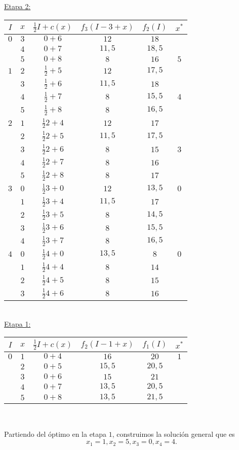 \documentclass[MIOP.tex]{subfiles}
\begin{document}
\begin{solucion}
\underline{Etapa 2:}\

\begin{tabular}{|c| c| c| c | c| c|}
\hline
$I$ & $x$ & $\frac{1}{2}I+c(x)$ & $f_3(I-3+x)$ &  $f_2(I)$ & $x^* $ \\
\hline
$0$ & $3$ & $0+6$ &  $12$  & $18$& \\
\hline
 & $4$ & $0+7$ &$11,5$ & $18,5$ &\\
\hline
 & $5$ & $0+8$ & $8$ & $16$& $\boxed{5}$\\
\hline
\hline
$1$ & $2$ & $\frac{1}{2}+5$ & $12$  & $17,5$& \\
\hline
 & $3$ & $\frac{1}{2}+6$ &$11,5$ & $18$ &\\
\hline
 & $4$ & $\frac{1}{2}+7$ & $8$ & $15,5$& $\boxed{4}$\\
\hline
 & $5$ & $\frac{1}{2}+8$ & $8$ & $16,5$ & \\
\hline
\hline
$2$ & $1$ & $\frac{1}{2}2+4$ & $12$  & $17$& \\
\hline
 & $2$ & $\frac{1}{2}2+5$ &$11,5$ & $17,5$ &\\
\hline
 & $3$ & $\frac{1}{2}2+6$ &$8$ & $15$ &$\boxed{3}$\\
\hline
 & $4$ & $\frac{1}{2}2+7$ & $8$ & $16$&\\
\hline
 & $5$ & $\frac{1}{2}2+8$ & $8$ & $17$ & \\
\hline
\hline
$3$ & $0$ & $\frac{1}{2}3+0$ & $12$  & $13,5$ & $\boxed{0}$\\
\hline
 & $1$ & $\frac{1}{2}3+4$ &$11,5$ & $17$ &\\
\hline
 & $2$ & $\frac{1}{2}3+5$ &$8$ & $14,5$ &\\
\hline
 & $3$ & $\frac{1}{2}3+6$ & $8$ & $15,5$&\\
 \hline
 & $4$ & $\frac{1}{2}3+7$ & $8$ & $16,5$&\\
 \hline
 \hline
 $4$ & $0$ & $\frac{1}{2}4+0$ & $13,5$  & $8$& $\boxed{0}$\\
\hline
 & $1$ & $\frac{1}{2}4+4$ &$8$ & $14$ &\\
\hline
 & $2$ & $\frac{1}{2}4+5$ &$8$ & $15$ &\\
 \hline
  & $3$ & $\frac{1}{2}4+6$ &$8$ & $16$ &\\
 \hline
\end{tabular}\
\\

\underline{Etapa 1:}\

\begin{tabular}{|c| c| c| c | c| c|}
\hline
$I$ & $x$ & $\frac{1}{2}I+c(x)$ & $f_2(I-1+x)$ &  $f_1(I)$ & $x^* $ \\
\hline
$0$ & $1$ & $0+4$ &  $16$  & $20$& $\boxed{1}$ \\
\hline
 & $2$ & $0+5$ &$15,5$ & $20,5$ &\\
\hline
 & $3$ & $0+6$ & $15$ & $21$& \\
 \hline
 & $4$ & $0+7$ & $13,5$ & $20,5$& \\
 \hline
 & $5$ & $0+8$ & $13,5$ & $21,5$& \\
\hline
\end{tabular}\

Partiendo del óptimo en la etapa $1$, construimos la solución general que es
$$x_1=1,x_2=5,x_3=0,x_4=4.$$
\end{solucion}
\end{document}
